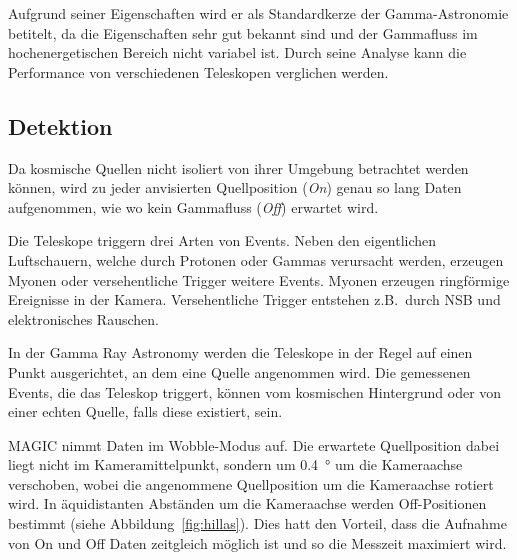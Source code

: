 Aufgrund seiner Eigenschaften wird er als Standardkerze der Gamma-Astronomie betitelt,
da die Eigenschaften sehr gut bekannt sind
und der Gammafluss im hochenergetischen Bereich nicht variabel ist.
Durch seine Analyse kann die Performance von verschiedenen Teleskopen verglichen werden.

\subsection*{Detektion}%
\label{sub:wobbelmodus}

Da kosmische Quellen nicht isoliert von ihrer Umgebung betrachtet
werden können,
wird zu jeder anvisierten Quellposition (\textit{On})
genau so lang Daten aufgenommen,
wie wo kein Gammafluss (\textit{Off}) erwartet wird.

Die Teleskope triggern drei Arten von Events.
Neben den eigentlichen Luftschauern,
welche durch Protonen
oder Gammas verursacht werden,
erzeugen Myonen oder versehentliche Trigger weitere Events.
Myonen erzeugen ringförmige Ereignisse in der Kamera.
Versehentliche Trigger entstehen z.B.\ durch NSB und elektronisches Rauschen.

In der Gamma Ray Astronomy werden die Teleskope in der Regel auf einen Punkt
ausgerichtet, an dem eine Quelle angenommen wird.
Die gemessenen Events, die das Teleskop triggert, können vom
kosmischen Hintergrund oder von einer echten Quelle, falls diese existiert, sein.

MAGIC nimmt Daten im Wobble-Modus auf.
Die erwartete Quellposition dabei liegt nicht im
Kameramittelpunkt,
sondern um
\SI{0.4}{\degree} um die Kameraachse
verschoben,
wobei die angenommene Quellposition um die Kameraachse rotiert wird.
In äquidistanten Abständen um die Kameraachse
werden Off-Positionen bestimmt (siehe Abbildung~\ref{fig:hillas}).
Dies hatt den Vorteil, dass die Aufnahme von On und Off Daten zeitgleich möglich
ist und so die Messzeit maximiert wird.


\clearpage
